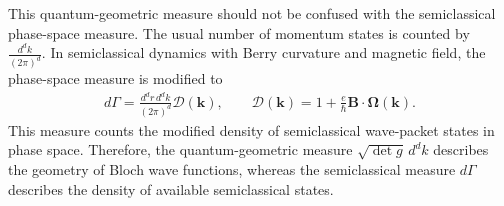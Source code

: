 \documentclass[12pt, oneside]{article}
\newcommand{\p}[1]{\left(#1\right)}
\numberwithin{equation}{subsection}
\begin{document}
This quantum-geometric measure should not be confused with the semiclassical phase-space measure. 
The usual number of momentum states is counted by \(\frac{d^d k}{\p{2 \pi}^{d}}.\)
In semiclassical dynamics with Berry curvature and magnetic field, the phase-space measure is modified to
\begin{align}
	d\Gamma = \frac{d^d r\,d^d k}{\p{2 \pi}^{d}} \mathcal D(\mathbf k), \qquad \mathcal D(\mathbf k) = 1+\frac{e}{\hbar}\mathbf B\cdot\boldsymbol\Omega(\mathbf k).
\end{align}
This measure counts the modified density of semiclassical wave-packet states in phase space.  Therefore, the quantum-geometric measure \(\sqrt{\det g}\,d^d k\) describes the geometry of Bloch wave functions, whereas the semiclassical measure \(d\Gamma\) describes the density of available semiclassical states.
\end{document}
